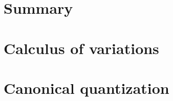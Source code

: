 \documentclass[a4paper]{article}
\theoremstyle{definition}
\numberwithin{equation}{section}
\begin{document}
  \newpage

  \section{Summary}\label{section: summary}
  

  \newpage

  \begin{appendices}
    \section{Calculus of variations}\label{appendix: calculus of variation}
    

    \section{Canonical quantization}\label{appendix:canonical_quantization}
    
  \end{appendices}

  \newpage

  \printbibliography{}
\end{document}
